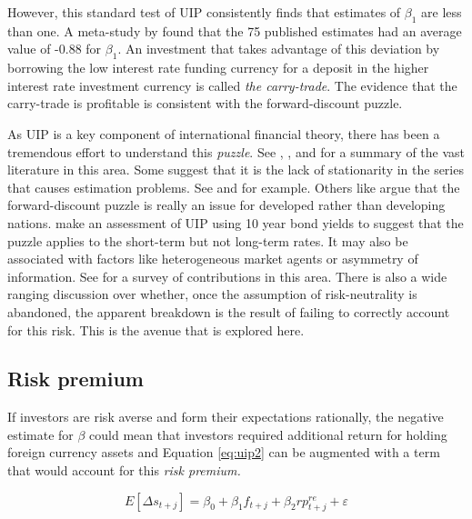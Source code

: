 \documentclass[12pt, a4paper, oneside]{article}\usepackage[]{graphicx}\usepackage[]{color}
\begin{document}
However, this standard test of UIP consistently finds that estimates of  $\beta_1$ are less than one.  A meta-study by \citet{FrootUIP} found that the 75 published estimates had an average value of -0.88 for $\beta_1$.   An investment that takes advantage of this deviation by borrowing the low interest rate funding currency for a deposit in the higher interest rate investment currency is called \emph{the carry-trade}.  The evidence that the carry-trade is profitable is consistent with the forward-discount puzzle.  

As UIP is a key component of international financial theory, there has been a tremendous effort to understand this \emph{puzzle}.  See \citet{FrootUIP}, \citet{Hodrick1987},  \citet{Engel1996} and \citet{EngelHandbook} for a summary of the vast literature in this area. Some suggest that it is the lack of stationarity in the series that causes estimation problems. See \citet{Engel1996} and \citet{Roll2000} for example. Others like \citet{Bansal1999} argue that the forward-discount puzzle is really an issue for developed rather than developing nations.   \citet{Chinn2004} make an assessment of UIP using 10 year bond yields to suggest that the puzzle applies to the short-term but not long-term rates.  It may also be associated with factors like heterogeneous market agents or asymmetry of information. See \citet{Bacchetta2012} for a survey of contributions in this area. There is also a wide ranging discussion over whether, once the assumption of risk-neutrality is abandoned, the apparent breakdown is the result of failing to correctly account for this risk. This is the avenue that is explored here. 

\subsection{Risk premium}
If investors are risk averse and form their expectations rationally, the negative estimate for $\beta$ could mean that investors required additional return for holding foreign currency assets and Equation \ref{eq:uip2} can be augmented with a term that would account for this \emph{risk premium.}  

\begin{equation}
\label{eqref:fb1}
E[\Delta s_{t + j}]= \beta_0 +\beta_1 f_{t+j} + \beta_2 rp^{re}_{t +j} + \varepsilon
\end{equation}
\end{document}
